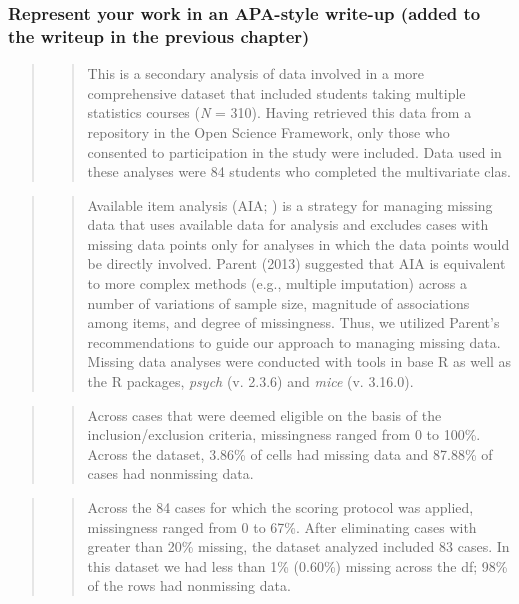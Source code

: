\documentclass[
  11pt,
]{book}
\begin{document}
\hypertarget{represent-your-work-in-an-apa-style-write-up-added-to-the-writeup-in-the-previous-chapter-1}{%
\subsubsection*{Represent your work in an APA-style write-up (added to the writeup in the previous chapter)}\label{represent-your-work-in-an-apa-style-write-up-added-to-the-writeup-in-the-previous-chapter-1}}


\begin{quote}
\begin{quote}
This is a secondary analysis of data involved in a more comprehensive dataset that included students taking multiple statistics courses (\emph{N} = 310). Having retrieved this data from a repository in the Open Science Framework, only those who consented to participation in the study were included. Data used in these analyses were 84 students who completed the multivariate clas.
\end{quote}
\end{quote}

\begin{quote}
\begin{quote}
Available item analysis (AIA; \citep{parent_handling_2013}) is a strategy for managing missing data that uses available data for analysis and excludes cases with missing data points only for analyses in which the data points would be directly involved. Parent (2013) suggested that AIA is equivalent to more complex methods (e.g., multiple imputation) across a number of variations of sample size, magnitude of associations among items, and degree of missingness. Thus, we utilized Parent's recommendations to guide our approach to managing missing data. Missing data analyses were conducted with tools in base R as well as the R packages, \emph{psych} (v. 2.3.6) and \emph{mice} (v. 3.16.0).
\end{quote}
\end{quote}

\begin{quote}
\begin{quote}
Across cases that were deemed eligible on the basis of the inclusion/exclusion criteria, missingness ranged from 0 to 100\%. Across the dataset, 3.86\% of cells had missing data and 87.88\% of cases had nonmissing data.
\end{quote}
\end{quote}

\begin{quote}
\begin{quote}
Across the 84 cases for which the scoring protocol was applied, missingness ranged from 0 to 67\%. After eliminating cases with greater than 20\% missing, the dataset analyzed included 83 cases. In this dataset we had less than 1\% (0.60\%) missing across the df; 98\% of the rows had nonmissing data.
\end{quote}
\end{quote}
\end{document}
